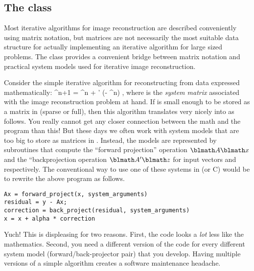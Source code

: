 
\subsection{The \fatrix class}

Most iterative algorithms
for image reconstruction
are described conveniently using matrix notation,
but matrices are not necessarily
the most suitable data structure
for actually implementing an iterative algorithm
for large sized problems.
The \fatrix class
provides a convenient bridge
between matrix notation
and practical system models
used for iterative image reconstruction.

Consider the simple iterative algorithm
for reconstructing \x from data \y
expressed mathematically:
\be
\x^{n+1} = \x^n + \alpha \A' (\y - \A\x^n)
,
where \A is the \emph{system matrix}
associated with
the image reconstruction problem at hand.
%
If \A is small enough
to be stored as a matrix in \matlab
(sparse or full),
then this algorithm translates
very nicely into \matlab as follows.
\be
{}
You really cannot get any closer connection
between the math and the program than this!
But these days we often work
with system models
that are too big to store
as matrices in \matlab.
Instead,
the models
are represented by subroutines
that compute the ``forward projection'' operation
$\A \x$
and the ``backprojection operation
$\A' \z$
for input vectors \x and \z respectively.
%
The conventional way
to use one of these systems
in \matlab (or C) would be to rewrite
the above program as follows.
\begin{verbatim}
Ax = forward_project(x, system_arguments)
residual = y - Ax;
correction = back_project(residual, system_arguments)
x = x + alpha * correction
\end{verbatim}
Yuch!
This is displeasing for two reasons.
First,
the code looks a \emph{lot} less like the mathematics.
Second,
you need a different version of the code
for every different system model
(forward/back-projector pair)
that you develop.
Having multiple versions
of a simple algorithm
creates a software maintenance headache.


